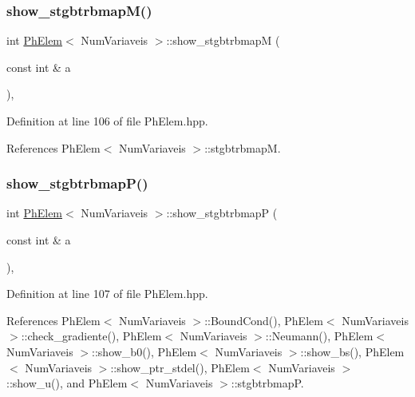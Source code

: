 \mbox{\label{classPhElem_a5f0e8811ea30343e51e4be9ff40d2b74}} 
\subsubsection{\texorpdfstring{show\+\_\+stgbtrbmap\+M()}{show\_stgbtrbmapM()}}
{\footnotesize\ttfamily int \hyperlink{classPhElem}{Ph\+Elem}$<$ Num\+Variaveis $>$\+::show\+\_\+stgbtrbmapM (\begin{DoxyParamCaption}\item[{const int \&}]{a }\end{DoxyParamCaption})\hspace{0.3cm}{\ttfamily [inline]}, {\ttfamily [inherited]}}



Definition at line 106 of file Ph\+Elem.\+hpp.



References Ph\+Elem$<$ Num\+Variaveis $>$\+::stgbtrbmapM.

\mbox{\label{classPhElem_a3d9e8990f4442e3b17e1cce3c9af19e9}} 
\subsubsection{\texorpdfstring{show\+\_\+stgbtrbmap\+P()}{show\_stgbtrbmapP()}}
{\footnotesize\ttfamily int \hyperlink{classPhElem}{Ph\+Elem}$<$ Num\+Variaveis $>$\+::show\+\_\+stgbtrbmapP (\begin{DoxyParamCaption}\item[{const int \&}]{a }\end{DoxyParamCaption})\hspace{0.3cm}{\ttfamily [inline]}, {\ttfamily [inherited]}}



Definition at line 107 of file Ph\+Elem.\+hpp.



References Ph\+Elem$<$ Num\+Variaveis $>$\+::\+Bound\+Cond(), Ph\+Elem$<$ Num\+Variaveis $>$\+::check\+\_\+gradiente(), Ph\+Elem$<$ Num\+Variaveis $>$\+::\+Neumann(), Ph\+Elem$<$ Num\+Variaveis $>$\+::show\+\_\+b0(), Ph\+Elem$<$ Num\+Variaveis $>$\+::show\+\_\+bs(), Ph\+Elem$<$ Num\+Variaveis $>$\+::show\+\_\+ptr\+\_\+stdel(), Ph\+Elem$<$ Num\+Variaveis $>$\+::show\+\_\+u(), and Ph\+Elem$<$ Num\+Variaveis $>$\+::stgbtrbmapP.

